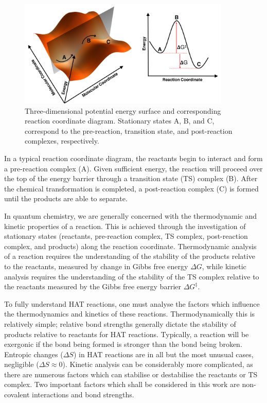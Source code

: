 \begin{figure}[htb]
  \centering
  \includegraphics[width=0.9\textwidth]{figures/pes-1}
  \caption[Three-dimensional potential energy surface and corresponding reaction coordinate diagram.]{Three-dimensional potential energy surface and corresponding reaction coordinate diagram. Stationary states A, B, and C, correspond to the pre-reaction, transition state, and post-reaction complexes, respectively.}
\label{fig:pes}
\end{figure}

\noindent In a typical reaction coordinate diagram, the reactants begin to interact and form a pre-reaction complex (A). Given sufficient energy, the reaction will proceed over the top of the energy barrier through a transition state (TS) complex (B). After the chemical transformation is completed, a post-reaction complex (C) is formed until the products are able to separate.

In quantum chemistry, we are generally concerned with the thermodynamic and kinetic properties of a reaction. This is achieved through the investigation of stationary states (reactants, pre-reaction complex, TS complex, post-reaction complex, and products) along the reaction coordinate. Thermodynamic analysis of a reaction requires the understanding of the stability of the products relative to the reactants, measured by change in Gibbs free energy $\Delta G$, while kinetic analysis requires the understanding of the stability of the TS complex relative to the reactants measured by the Gibbs free energy barrier $\Delta G^{\ddagger}$.

To fully understand HAT reactions, one must analyse the factors which influence the thermodynamics and kinetics of these reactions. Thermodynamically this is relatively simple; relative bond strengths generally dictate the stability of products relative to reactants for HAT reactions. Typically, a reaction will be exergonic if the bond being formed is stronger than the bond being broken. Entropic changes ($\Delta S$) in HAT reactions are in all but the most unusual cases, negligible ($\Delta S \approx 0$).\cite{Mader2007} Kinetic analysis can be considerably more complicated, as there are numerous factors which can stabilise or destabilise the reactants or TS complex. Two important factors which shall be considered in this work are non-covalent interactions and bond strengths.

